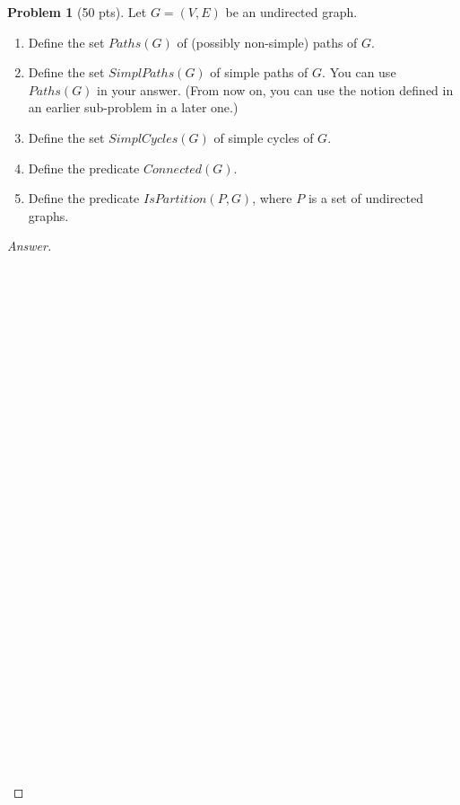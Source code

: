 \documentclass[11pt,a4paper,oneside,microtype,nokorean]{oblivoir}
\theoremstyle{definition}
\newtheorem{problem}{Problem}
\begin{document}
\begin{problem}[50 pts]
  Let $G = (V,E)$ be an undirected graph.

  \begin{enumerate}
  \item Define the set $Paths(G)$ of (possibly non-simple) paths of $G$.
  \item Define the set $SimplPaths(G)$ of simple paths of $G$.  You can use $Paths(G)$ in your
    answer.  (From now on, you can use the notion defined in an earlier sub-problem in a later one.)
  \item Define the set $SimplCycles(G)$ of simple cycles of $G$.
  \item Define the predicate $Connected(G)$.
  \item Define the predicate $IsPartition(P, G)$, where $P$ is a set of undirected graphs.
  \end{enumerate}
\end{problem}
\begin{proof}[Answer]
  \ 
  \\
  \\
  \\
  \\
  \\
  \\
  \\
  \\
  \\
  \\
  \\
  \\
  \\
  \\
  \\
  \\
  \\
  \\
  \\
  \\
  \\
  \\
  \\
  \\
  \\
  \\
  \\
  \\
  \\
  \\
  \\
\end{proof}
\end{document}
